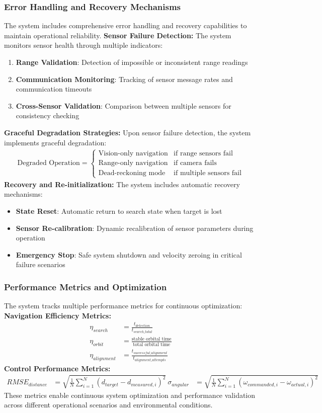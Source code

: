 \subsubsection{Error Handling and Recovery Mechanisms}
The system includes comprehensive error handling and recovery capabilities to maintain operational reliability.
\textbf{Sensor Failure Detection:}
The system monitors sensor health through multiple indicators:
\begin{enumerate}
\item \textbf{Range Validation}: Detection of impossible or inconsistent range readings
\item \textbf{Communication Monitoring}: Tracking of sensor message rates and communication timeouts
\item \textbf{Cross-Sensor Validation}: Comparison between multiple sensors for consistency checking
\end{enumerate}
\textbf{Graceful Degradation Strategies:}
Upon sensor failure detection, the system implements graceful degradation:
\begin{align}
\text{Degraded Operation} = \begin{cases}
\text{Vision-only navigation} & \text{if range sensors fail} \\
\text{Range-only navigation} & \text{if camera fails} \\
\text{Dead-reckoning mode} & \text{if multiple sensors fail}
\end{cases}
\end{align}
\textbf{Recovery and Re-initialization:}
The system includes automatic recovery mechanisms:
\begin{itemize}
\item \textbf{State Reset}: Automatic return to search state when target is lost
\item \textbf{Sensor Re-calibration}: Dynamic recalibration of sensor parameters during operation
\item \textbf{Emergency Stop}: Safe system shutdown and velocity zeroing in critical failure scenarios
\end{itemize}
\subsubsection{Performance Metrics and Optimization}
The system tracks multiple performance metrics for continuous optimization:
\textbf{Navigation Efficiency Metrics:}
\begin{align}
\eta_{search} &= \frac{t_{detection}}{t_{search\_total}} \\
\eta_{orbit} &= \frac{\text{stable orbital time}}{\text{total orbital time}} \\
\eta_{alignment} &= \frac{t_{successful\_alignment}}{t_{alignment\_attempts}}
\end{align}
\textbf{Control Performance Metrics:}
\begin{align}
RMSE_{distance} &= \sqrt{\frac{1}{N}\sum_{i=1}^{N}(d_{target} - d_{measured,i})^2} \
\sigma_{angular} &= \sqrt{\frac{1}{N}\sum_{i=1}^{N}(\omega_{commanded,i} - \omega_{actual,i})^2}
\end{align}
These metrics enable continuous system optimization and performance validation across different operational scenarios and environmental conditions.
